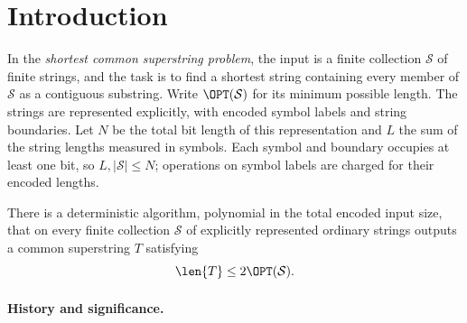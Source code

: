 \begin{abstract}
We give a deterministic algorithm that, for every finite family of explicitly
represented ordinary strings, outputs a common superstring of length at most
twice the optimum in time polynomial in the total encoded input size, including
symbol labels. The guarantee applies to the algorithm constructed here, not the
classical maximum-overlap Greedy procedure.
\end{abstract}
\section{Introduction}\label{sec:intro}

In the \emph{shortest common superstring problem}, the input is a finite collection $\mathcal S$ of finite strings, and the task is to find a shortest string containing every member of $\mathcal S$ as a contiguous substring. Write $\OPT(\mathcal S)$ for its minimum possible length. The strings are represented explicitly, with encoded symbol labels and string boundaries. Let $N$ be the total bit length of this representation and $L$ the sum of the string lengths measured in symbols. Each symbol and boundary occupies at least one bit, so $L,|\mathcal S|\le N$; operations on symbol labels are charged for their encoded lengths.

\begin{theorem}\label{thm:main}
There is a deterministic algorithm, polynomial in the total encoded input size, that on every finite collection $\mathcal S$ of explicitly represented ordinary strings outputs a common superstring $T$ satisfying
\[
\len{T}\le 2\OPT(\mathcal S).
\]
\end{theorem}

\paragraph{History and significance.}
